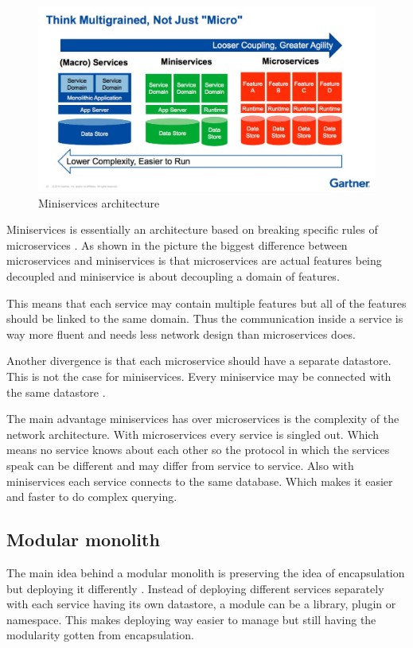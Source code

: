 \begin{figure}[H]
	\includegraphics[width=\linewidth]{miniservices.png}
	\caption{Miniservices architecture \cite{miniservicesDefinition}}
\end{figure}

Miniservices is essentially an architecture based on breaking specific rules of microservices \cite{miniservicesOrigin}. As shown in the picture the biggest difference between microservices and miniservices is that microservices are actual features being decoupled and miniservice is about decoupling a domain of features.

This means that each service may contain multiple features but all of the features should be linked to the same domain. Thus the communication inside a service is way more fluent and needs less network design than microservices does.

Another divergence is that each microservice should have a separate datastore. This is not the case for miniservices. Every miniservice may be connected with the same datastore \cite{miniservicesDefinition}.

The main advantage miniservices has over microservices is the complexity of the network architecture. With microservices every service is singled out. Which means no service knows about each other so the protocol in which the services speak can be different and may differ from service to service. Also with miniservices each service connects to the same database. Which makes it easier and faster to do complex querying.

\subsection{Modular monolith}
\label{sec:ModularMonolith}

The main idea behind a modular monolith is preserving the idea of encapsulation but deploying it differently \cite{modularMonolithIdea}. Instead of deploying different services separately with each service having its own datastore, a module can be a library, plugin or namespace. This makes deploying way easier to manage but still having the modularity gotten from encapsulation.

